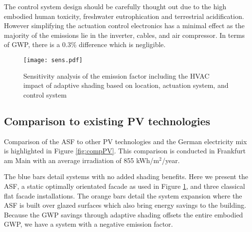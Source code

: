 The control system design should be carefully thought out due to the high embodied human toxicity, freshwater eutrophication and terrestrial acidification. However simplifying the actuation control electronics has a minimal effect as the majority of the emissions lie in the inverter, cables, and air compressor. In terms of GWP, there is a 0.3\% difference which is negligible.



\begin{figure}[H]
\begin{center}
\texttt{[image: sens.pdf]}
\caption{Sensitivity analysis of the emission factor including the HVAC impact of adaptive shading based on location, actuation system, and control system}
\label{fig:sens}
\end{center}
\end{figure}

\subsection{Comparison to existing PV technologies}

Comparison of the ASF to other PV technologies and the German electricity mix is highlighted in Figure \ref{fig:compPV}. This comparison is conducted in Frankfurt am Main with an average irradiation of 855 kWh/m$^2$/year.\

The blue bars detail systems with no added shading benefits. Here we present the ASF, a static optimally orientated facade as used in Figure \ref{fig:sens}, and three classical flat facade installations.  
The orange bars detail the system expansion where the ASF is built over glazed surfaces which also bring energy savings to the building. Because the GWP savings through adaptive shading offsets the entire embodied GWP, we have a system with a negative emission factor.



